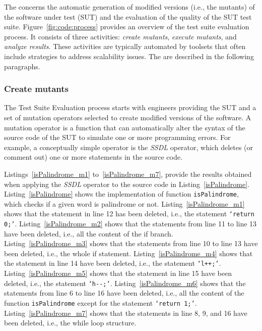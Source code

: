 The  concerns the automatic generation of modified versions (i.e., the mutants) of the software under test (SUT) and the evaluation of the quality of the SUT test suite. 
Figure~\ref{fig:code:process} provides an overview of the test suite evaluation process.
It consists of three activities: \emph{create mutants}, \emph{execute mutants}, and \emph{analyze results}.  
These activities are typically automated by toolsets that often include strategies to address scalability issues. The are described in the following paragraphs.


\subsubsection{Create mutants}

The Test Suite Evaluation process starts with engineers providing the SUT and a set of mutation operators selected to create modified versions of the software. 
A mutation operator is a function that can automatically alter the syntax of the source code of the SUT to simulate one or more programming errors.
For example, a conceptually simple operator is the \textit{SSDL} operator, which deletes (or comment out) one or more statements in the source code.



Listings~\ref{isPalindrome_m1} to~\ref{isPalindrome_m7}, provide the results obtained when applying the \textit{SSDL} operator to the source code in Listing~\ref{isPalindrome}.
Listing~\ref{isPalindrome} shows the implementation of function \texttt{isPalindrome}, which checks if a given word is palindrome or not.
Listing~\ref{isPalindrome_m1} shows that the statement in line 12 has been deleted, i.e., the statement \texttt{`return 0;'}.
Listing~\ref{isPalindrome_m2} shows that the statements from line 11 to line 13 have been deleted, i.e., all the content of the if branch.
Listing~\ref{isPalindrome_m3} shows that the statements from line 10 to line 13 have been deleted, i.e., the whole if statement.
Listing~\ref{isPalindrome_m4} shows that the statement in line 14 have been deleted, i.e., the statement \texttt{`l++;'}.
Listing~\ref{isPalindrome_m5} shows that the statement in line 15 have been deleted, i.e., the statement \texttt{`h-}\texttt{-;'}.
Listing~\ref{isPalindrome_m6} shows that the statements from line 6 to line 16 have been deleted, i.e., all the content of the function \texttt{isPalindrome} except for the statement \texttt{`return 1;'}.
Listing~\ref{isPalindrome_m7} shows that the statements in line 8, 9, and 16 have been deleted, i.e., the while loop structure.

